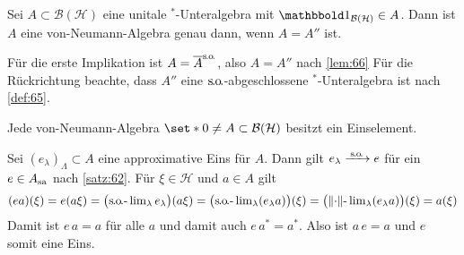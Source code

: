 \begin{korollar}[{name={von Neumanns Bikommutantensatz}},label=korr:67]
	Sei $A \subset \mathcal{B}(\mathcal{H})$ eine unitale $^*$-Unteralgebra mit $\ind_{\mathcal{B}(\mathcal{H})} \in A$.
	Dann ist $A$ eine von-Neumann-Algebra genau dann, wenn $A=A''$ ist.
\end{korollar}
\begin{beweis}
	Für die erste Implikation ist $A= \overline{A}^{\mathrm{\mkern.3mu s\mkern-1.4mu.\mkern-.6mu o\mkern-1.7mu.}}$, also $A=A''$ nach \autoref{lem:66}
	Für die Rückrichtung beachte, dass $A''$ eine $\mathrm{\mkern.3mu s\mkern-1.4mu.\mkern-.6mu o\mkern-1.7mu.}$-abgeschlossene $^*$-Unteralgebra ist nach \autoref{def:65}.
\end{beweis}

\begin{proposition}[{name=[von-Neumann-Algebren haben Einselemente]},label=prop:68]
	Jede von-Neumann-Algebra $\set*{0}\neq A \subset \mathcal{B}(\mathcal{H})$ besitzt ein Einselement.
\end{proposition}
\begin{beweis}
	Sei $(e_\lambda)_\Lambda \subset A$ eine approximative Eins für $A$.
	Dann gilt $e_\lambda \grenzw{\raisemath{-3pt}{\so}}e$ für ein $e \in A_{\mathrm{sa}}$ nach \autoref{satz:62}.
	Für $\xi \in \mathcal{H}$ und $a \in A$ gilt
	\[
		(ea)(\xi) = e \enbrace*{a \xi} = \enbrace[\big]{\so\text{-}\lim\nolimits_\lambda e_\lambda} (a \xi) = \enbrace[\big]{\so\text{-}\lim\nolimits_\lambda (e_\lambda a)}(\xi) = \enbrace[\big]{\norm{\cdot}\text{-}\lim\nolimits_\lambda (e_\lambda a)}(\xi) = a(\xi)
	\]
	Damit ist $e\,a =a$ für alle $a$ und damit auch $e\,a^*= a^*$. Also ist $a\,e =a$ und $e$ somit eine Eins.
\end{beweis}

